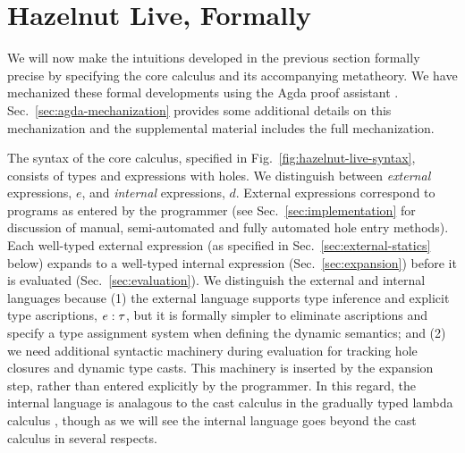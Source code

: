 
\clearpage
\newcommand{\calculusSec}{Hazelnut Live, Formally}
\section{\protect\calculusSec}
\label{sec:calculus}

We will now make the intuitions developed in the previous section formally precise by specifying the \HazelnutLive core calculus and  its accompanying metatheory. We have mechanized these formal developments using the Agda proof assistant \cite{norell:thesis,norell2009dependently}. Sec.~\ref{sec:agda-mechanization} provides some additional details on this mechanization and the supplemental material includes the full mechanization. %

The syntax of the core calculus, specified in Fig.~\ref{fig:hazelnut-live-syntax}, consists of types and expressions with holes. We distinguish between \emph{external} expressions, $e$, and \emph{internal} expressions, $d$. External expressions correspond to programs as entered by the programmer (see Sec.~\ref{sec:implementation} for discussion of manual, semi-automated and fully automated hole entry methods). Each well-typed external expression (as specified in Sec.~\ref{sec:external-statics} below) expands to a well-typed internal expression (Sec.~\ref{sec:expansion}) before it is evaluated (Sec.~\ref{sec:evaluation}). We distinguish the external and internal languages because (1) the external language supports type inference and explicit type ascriptions, $e : \tau$, but it is  formally simpler to eliminate ascriptions and specify a type assignment system when defining the dynamic semantics; and (2) we need additional syntactic machinery during evaluation for tracking hole closures and dynamic type casts. This machinery is inserted by the expansion step, rather than entered explicitly by the programmer. In this regard, the internal language is analagous to the cast calculus in the gradually typed lambda calculus \cite{DBLP:conf/snapl/SiekVCB15,Siek06a}, though as we will see the \HazelnutLive internal language goes beyond the cast calculus in several respects.




